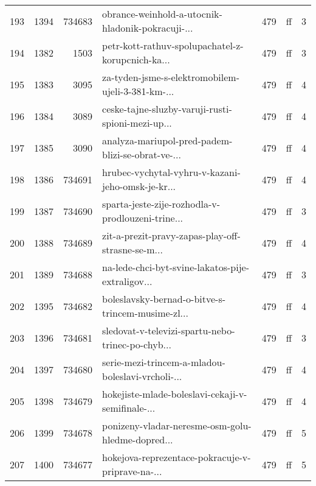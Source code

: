 \begin{tabular}{lrrlrlr}
193  &       1394 &   734683 &  obrance-weinhold-a-utocnik-hladonik-pokracuji-... &      479 &                           ff &               3 \\
194  &       1382 &     1503 &  petr-kott-rathuv-spolupachatel-z-korupcnich-ka... &      479 &                           ff &               3 \\
195  &       1383 &     3095 &  za-tyden-jsme-s-elektromobilem-ujeli-3-381-km-... &      479 &                           ff &               4 \\
196  &       1384 &     3089 &  ceske-tajne-sluzby-varuji-rusti-spioni-mezi-up... &      479 &                           ff &               4 \\
197  &       1385 &     3090 &  analyza-mariupol-pred-padem-blizi-se-obrat-ve-... &      479 &                           ff &               4 \\
198  &       1386 &   734691 &  hrubec-vychytal-vyhru-v-kazani-jeho-omsk-je-kr... &      479 &                           ff &               4 \\
199  &       1387 &   734690 &  sparta-jeste-zije-rozhodla-v-prodlouzeni-trine... &      479 &                           ff &               3 \\
200  &       1388 &   734689 &  zit-a-prezit-pravy-zapas-play-off-strasne-se-m... &      479 &                           ff &               4 \\
201  &       1389 &   734688 &  na-lede-chci-byt-svine-lakatos-pije-extraligov... &      479 &                           ff &               3 \\
202  &       1395 &   734682 &  boleslavsky-bernad-o-bitve-s-trincem-musime-zl... &      479 &                           ff &               4 \\
203  &       1396 &   734681 &  sledovat-v-televizi-spartu-nebo-trinec-po-chyb... &      479 &                           ff &               3 \\
204  &       1397 &   734680 &  serie-mezi-trincem-a-mladou-boleslavi-vrcholi-... &      479 &                           ff &               4 \\
205  &       1398 &   734679 &  hokejiste-mlade-boleslavi-cekaji-v-semifinale-... &      479 &                           ff &               4 \\
206  &       1399 &   734678 &  ponizeny-vladar-neresme-osm-golu-hledme-dopred... &      479 &                           ff &               5 \\
207  &       1400 &   734677 &  hokejova-reprezentace-pokracuje-v-priprave-na-... &      479 &                           ff &               5 \\

\end{tabular}
